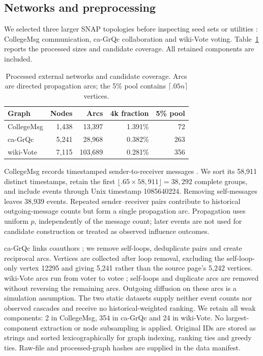 \documentclass[smallextended]{svjour3}
\begin{document}
\subsection{Networks and preprocessing}
We selected three larger SNAP topologies before inspecting seed sets or utilities \cite{snap}: CollegeMsg communication, ca-GrQc collaboration and wiki-Vote voting. Table~\ref{tab:data} reports the processed sizes and candidate coverage. All retained components are included.
\begin{table}[htbp]
\caption{Processed external networks and candidate coverage. Arcs are directed propagation arcs; the 5\% pool contains $\lceil .05n\rceil$ vertices.}\label{tab:data}
\begin{tabular}{lrrrr}
\toprule
Graph & Nodes & Arcs & 4k fraction & 5\% pool \\
\midrule
CollegeMsg & 1,438 & 13,397 & 1.391\% & 72 \\
ca-GrQc & 5,241 & 28,968 & 0.382\% & 263 \\
wiki-Vote & 7,115 & 103,689 & 0.281\% & 356 \\
\bottomrule
\end{tabular}
\end{table}

CollegeMsg records timestamped sender-to-receiver messages \cite{college}. We sort its 58,911 distinct timestamps, retain the first $\lfloor .65\times58,911\rfloor=38,292$ complete groups, and include events through Unix timestamp 1085640224. Removing self-messages leaves 38,939 events. Repeated sender--receiver pairs contribute to historical outgoing-message counts but form a single propagation arc. Propagation uses uniform $p$, independently of the message count; later events are not used for candidate construction or treated as observed influence outcomes.

ca-GrQc links coauthors \cite{grqc}; we remove self-loops, deduplicate pairs and create reciprocal arcs. Vertices are collected after loop removal, excluding the self-loop-only vertex 12295 and giving 5,241 rather than the source page's 5,242 vertices. wiki-Vote arcs run from voter to votee \cite{signed,links}; self-loops and duplicate arcs are removed without reversing the remaining arcs. Outgoing diffusion on these arcs is a simulation assumption. The two static datasets supply neither event counts nor observed cascades and receive no historical-weighted ranking. We retain all weak components: 2 in CollegeMsg, 354 in ca-GrQc and 24 in wiki-Vote. No largest-component extraction or node subsampling is applied. Original IDs are stored as strings and sorted lexicographically for graph indexing, ranking ties and greedy ties. Raw-file and processed-graph hashes are supplied in the data manifest.
\end{document}
